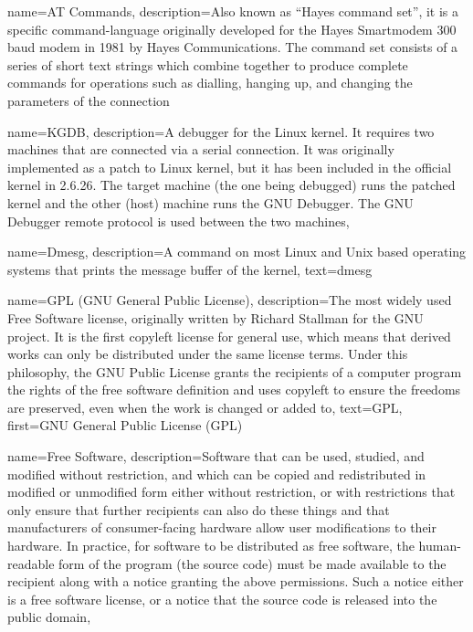 {
  name=AT Commands,
  description={Also known as ``Hayes command set'', it is a specific
    command-language originally developed for the Hayes Smartmodem 300
    baud modem in 1981 by Hayes Communications. The command set
    consists of a series of short text strings which combine together
    to produce complete commands for operations such as dialling,
    hanging up, and changing the parameters of the connection}
}

{
  name=KGDB,
  description={A debugger for the Linux kernel. It requires two
    machines that are connected via a serial connection. It was
    originally implemented as a patch to Linux kernel, but it has been
    included in the official kernel in 2.6.26. The target machine (the
    one being debugged) runs the patched kernel and the other (host)
    machine runs the GNU Debugger. The GNU Debugger remote protocol is
    used between the two machines},
}

{
  name=Dmesg,
  description={A command on most Linux and Unix based operating
    systems that prints the message buffer of the kernel},
  text=dmesg
}

{
  name=GPL (GNU General Public License),
  description={The most widely used Free Software license, originally
    written by Richard Stallman for the GNU project. It is the first
    copyleft license for general use, which means that derived works
    can only be distributed under the same license terms. Under this
    philosophy, the GNU Public License grants the recipients of a
    computer program the rights of the free software definition and
    uses copyleft to ensure the freedoms are preserved, even when the
    work is changed or added to},
  text=GPL,
  first=GNU General Public License (GPL)
}

{
  name=Free Software,
  description={Software that can be used, studied, and modified
    without restriction, and which can be copied and redistributed in
    modified or unmodified form either without restriction, or with
    restrictions that only ensure that further recipients can also do
    these things and that manufacturers of consumer-facing hardware
    allow user modifications to their hardware. In practice, for
    software to be distributed as free software, the human-readable
    form of the program (the source code) must be made available to
    the recipient along with a notice granting the above
    permissions. Such a notice either is a free software license, or a
    notice that the source code is released into the public domain},
}

